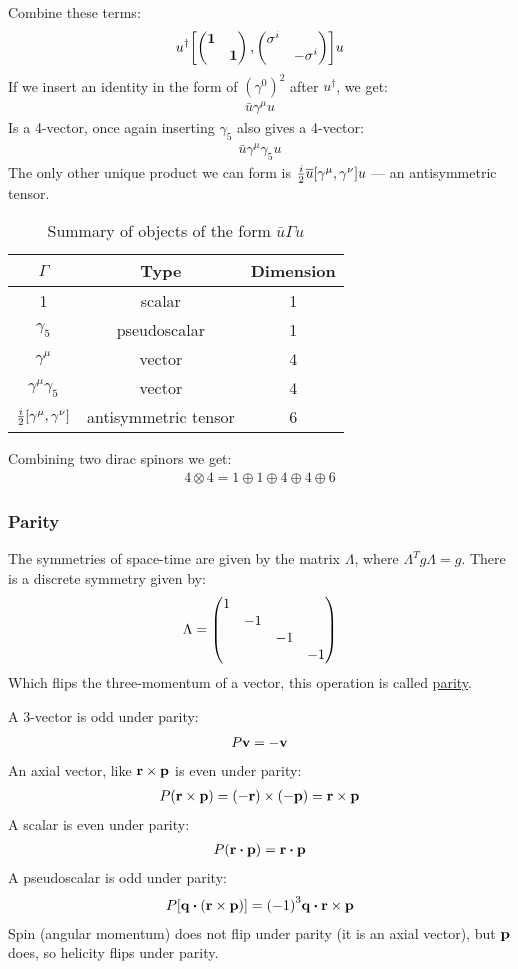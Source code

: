 Combine these terms:
\begin{align*}
  u^\dag\qty[\pmqty{\dmat{\bm{1},\bm{1}}},\pmqty{\dmat{\sigma^i,-\sigma^i}}]u
\end{align*}
If we insert an identity in the form of ${(\gamma^0)}^2$ after $u^\dag$, we get:
\begin{align*}
  \bar{u}\gamma^\mu u
\end{align*}
Is a 4-vector, once again inserting $\gamma_5$ also gives a 4-vector:
\begin{align*}
  \bar{u}\gamma^\mu\gamma_5u
\end{align*}
The only other unique product we can form is $\frac{i}2\bar{u}\comm{\gamma^\mu}{\gamma^\nu}u$ --- an antisymmetric tensor.
\begin{table}[H]
  \centering
  \begin{tabular}{ccc}
    $\Gamma$ & Type & Dimension \\\hline
    1 & scalar & 1 \\
    $\gamma_5$ & pseudoscalar & 1 \\
    $\gamma^\mu$ & vector & 4 \\
    $\gamma^\mu\gamma_5$ & vector & 4 \\
    $\frac{i}2\comm{\gamma^\mu}{\gamma^\nu}$ & antisymmetric tensor & 6
  \end{tabular}
  \caption{Summary of objects of the form $\bar{u}\Gamma u$}\label{tab:bilinears}
\end{table}
Combining two dirac spinors we get:
\begin{align*}
  4\otimes4=1\oplus1\oplus4\oplus4\oplus6
\end{align*}

\subsubsection{Parity}
The symmetries of space-time are given by the matrix $\Lambda$, where $\Lambda^T g\Lambda=g$. There is a discrete symmetry given by:
\begin{align*}
  \Lambda=\pmqty{\dmat{1,-1,-1,-1}}
\end{align*}
Which flips the three-momentum of a vector, this operation is called \underline{parity}.

A 3-vector is odd under parity:
\begin{align*}
  P\vb{v}=-\vb{v}
\end{align*}
An axial vector, like $\vb{r\times p}$ is even under parity:
\begin{align*}
  P(\vb{r\times p})=(-\vb{r})\times(-\vb{p})=\vb{r\times p}
\end{align*}
A scalar is even under parity:
\begin{align*}
  P(\vb{r\vdot p})=\vb{r\vdot p}
\end{align*}
A pseudoscalar is odd under parity:
\begin{align*}
  P[\vb{q}\vdot(\vb{r\times p})]={(-1)}^3\vb{q}\vdot\vb{r\times p}
\end{align*}
Spin (angular momentum) does not flip under parity (it is an axial vector), but $\vb{p}$ does, so helicity flips under parity.

